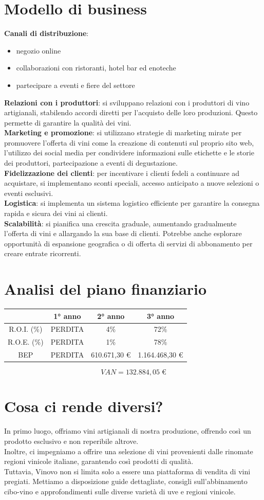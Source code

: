 \documentclass[12pt, a4paper]{article}
\newcommand{\meskip}{\medskip \\}
\begin{document}
\section*{Modello di business}
\textbf{Canali di distribuzione}:
\begin{itemize}[itemsep=-5pt, topsep=0pt]
    \item negozio online
    \item collaborazioni con ristoranti, hotel bar ed enoteche
    \item partecipare a eventi e fiere del settore
\end{itemize}\medskip
\textbf{Relazioni con i produttori}: si sviluppano relazioni con i produttori di vino artigianali, stabilendo accordi diretti per l'acquisto delle loro produzioni. Questo permette di garantire la qualità dei vini.\meskip
\textbf{Marketing e promozione}: si utilizzano strategie di marketing mirate per promuovere l'offerta di vini come la creazione di contenuti sul proprio sito web, l'utilizzo dei social media per condividere informazioni sulle etichette e le storie dei produttori, partecipazione a eventi di degustazione.\meskip
\textbf{Fidelizzazione dei clienti}: per incentivare i clienti fedeli a continuare ad acquistare, si implementano sconti speciali, accesso anticipato a nuove selezioni o eventi esclusivi.\meskip
\textbf{Logistica}: si implementa un sistema logistico efficiente per garantire la consegna rapida e sicura dei vini ai clienti.\meskip
\textbf{Scalabilità}: si pianifica una crescita graduale, aumentando gradualmente l'offerta di vini e allargando la sua base di clienti. Potrebbe anche esplorare opportunità di espansione geografica o di offerta di servizi di abbonamento per creare entrate ricorrenti.
\newpage
\section*{Analisi del piano finanziario}
\begin{tabular}{|c|c|c|c|}
    \hline
                & 1° anno & 2° anno      & 3° anno        \\ \hline
    R.O.I. (\%) & PERDITA & 4\%          & 72\%           \\ \hline
    R.O.E. (\%) & PERDITA & 1\%          & 78\%           \\ \hline
    BEP         & PERDITA & 610.671,30 € & 1.164.468,30 € \\ \hline
\end{tabular}\bigskip
$$VAN = 132.884,05 \; €$$

\section*{Cosa ci rende diversi?}
In primo luogo, offriamo vini artigianali di nostra produzione, offrendo così un prodotto esclusivo e non reperibile altrove.\\
Inoltre, ci impegniamo a offrire una selezione di vini provenienti dalle rinomate regioni vinicole italiane, garantendo così prodotti di qualità.\meskip
Tuttavia, Vinovo non si limita solo a essere una piattaforma di vendita di vini pregiati.
Mettiamo a disposizione guide dettagliate, consigli sull'abbinamento cibo-vino e approfondimenti sulle diverse varietà di uve e regioni vinicole.
\end{document}

